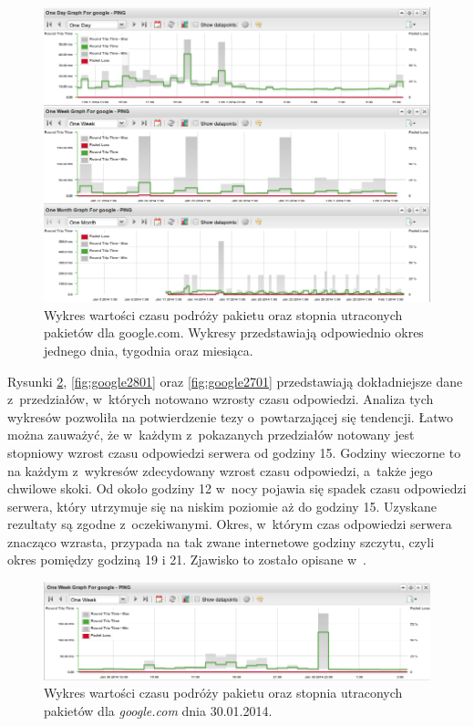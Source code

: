 \begin{figure}[ht]
  \caption{Wykres wartości czasu podróży pakietu oraz stopnia
    utraconych pakietów dla google.com.  Wykresy przedstawiają
    odpowiednio okres jednego dnia, tygodnia oraz miesiąca.}
  \label{fig:pingiGoogle}
  \centering
\includegraphics[width=1\textwidth]{img/pingiGoogle.png}
\end{figure}


Rysunki \ref{fig:google3001}, \ref{fig:google2801} oraz
\ref{fig:google2701} przedstawiają dokładniejsze dane z~przedziałów,
w~których notowano wzrosty czasu odpowiedzi. Analiza tych wykresów
pozwoliła na potwierdzenie tezy o~powtarzającej się tendencji. Łatwo
można zauważyć, że w~każdym z~pokazanych przedziałów notowany jest
stopniowy wzrost czasu odpowiedzi serwera od godziny 15. Godziny
wieczorne to na każdym z~wykresów zdecydowany wzrost czasu odpowiedzi,
a~także jego chwilowe skoki. Od około godziny 12 w~nocy pojawia się
spadek czasu odpowiedzi serwera, który utrzymuje się na niskim
poziomie aż do godziny 15. Uzyskane rezultaty są zgodne
z~oczekiwanymi. Okres, w~którym czas odpowiedzi serwera znacząco
wzrasta, przypada na tak zwane internetowe godziny szczytu, czyli
okres pomiędzy godziną 19 i 21. Zjawisko to zostało opisane
w~\cite{www:RushHours}.


\begin{figure}[H]
  \caption{Wykres wartości czasu podróży pakietu oraz stopnia
    utraconych pakietów dla {\em google.com} dnia 30.01.2014.}
  \label{fig:google3001}
  \centering
\includegraphics[width=1\textwidth]{img/google3001.png}
\end{figure}

